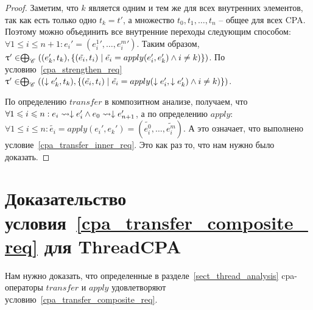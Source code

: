 \begin{proof}
Заметим, что $k$ является одним и тем же для всех внутренних элементов, так как есть только одно $t_k = t'$, а множество $t_0, t_1, \dots, t_n$ -- общее для всех CPA.
Поэтому можно объединить все внутренние переходы следующим способом:
$ \forall 1 \le i \le n+1: e_i' = ({e^1_i}', \dots, {e^m_i}')$.
Таким образом, $\uptau' \in \mathrel{\bigoplus}_{\mathscr{C}}((e_k', t_k), \{(\tilde{e_i}, t_i) \mid \tilde{e_i} = apply(e'_i, e'_k) \land i \neq k)\})$.
По условию~\ref{cpa_strengthen_req} $\uptau' \in \mathrel{\bigoplus}_{\mathscr{C}}((\downarrow e_k', t_k), \{(\tilde{e_i}, t_i) \mid \tilde{e_i} = apply(\downarrow  e'_i, \downarrow  e'_k) \land i \neq k)\})$.

По определению $transfer$ в композитном анализе, получаем, что $\forall 1 \leqslant i \leqslant n: e_i \leadsto \downarrow e_i' \land e_0 \leadsto \downarrow e'_{n+1}$, а по определению $apply$: $\forall 1 \le i \le n: \tilde{e_i} = apply(e_i', e_k') = (\tilde{e^0_i}, \dots, \tilde{e^m_i})$.
А это означает, что выполнено условие~\ref{cpa_transfer_inner_req}.
Это как раз то, что нам нужно было доказать. 
\end{proof}

\section{Доказательство условия~\ref{cpa_transfer_composite_req} для ThreadCPA}
\label{sect_transfer_thread_proof}

Нам нужно доказать, что определенные в разделе~\ref{sect_thread_analysis} cpa-операторы $transfer$ и $apply$ удовлетворяют условию~\ref{cpa_transfer_composite_req}.

